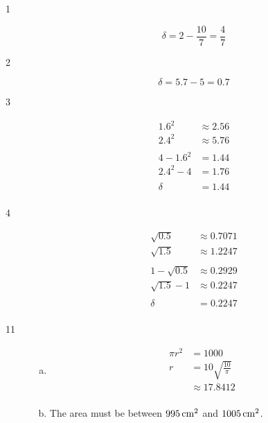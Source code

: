 \documentclass[letterpaper, landscape]{exam}
\begin{document}
    \begin{description}

      \item[1] 
        \[
          \delta = 2 - \frac{10}{7} = \boxed{ \frac{4}{7} }
        \]

      \item[2] 
        \[
          \delta = 5.7 - 5 = \boxed{ 0.7 }
        \]

      \item[3]
        \begin{align*}
          1.6^2     & \approx 2.56 \\
          2.4^2     & \approx 5.76 \\
          \\
          4 - 1.6^2 & = 1.44 \\
          2.4^2 - 4 & = 1.76 \\
          \\
          \delta    & = \boxed{ 1.44 } \\
        \end{align*}

      \item[4]
        \begin{align*}
          \sqrt{0.5}     & \approx 0.7071 \\
          \sqrt{1.5}     & \approx 1.2247 \\
          \\
          1 - \sqrt{0.5} & \approx 0.2929 \\
          \sqrt{1.5} - 1 & \approx 0.2247 \\
          \\
          \delta    & = \boxed{ 0.2247 } \\
        \end{align*}

      \item[11]
        \begin{enumerate}[(a)]
          \item 
            \begin{align*}
              \pi r^2 & = 1000 \\
              r       & = 10 \sqrt{\frac{10}{\pi}} \\
                      & \approx \boxed{ 17.8412 } \\
            \end{align*}

          \newpage

          \item The area must be between $\unit[995]{cm^2}$ and $\unit[1005]{cm^2}$. 
            

\end{enumerate}
\end{description}
\end{document}

